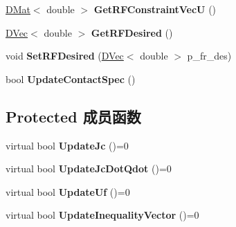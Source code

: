 \begin{DoxyCompactItemize}
\item 
\mbox{\label{classquadruped_1_1ContactSpec_ae668499ca7c34a8b950f58f45d4ad46f}} 
\hyperlink{cppTypes_8h_a5db6bfb25afa103db1fb6bb6287ae9d7}{D\+Mat}$<$ double $>$ {\bfseries Get\+R\+F\+Constraint\+VecU} ()
\item 
\mbox{\label{classquadruped_1_1ContactSpec_aec2ef05980f997148235386ae649510c}} 
\hyperlink{cppTypes_8h_adad69baca3c77d5f991be5d3c063fea7}{D\+Vec}$<$ double $>$ {\bfseries Get\+R\+F\+Desired} ()
\item 
\mbox{\label{classquadruped_1_1ContactSpec_a2f393f9d8a2fe2cadb9eb80a3d16aa44}} 
void {\bfseries Set\+R\+F\+Desired} (\hyperlink{cppTypes_8h_adad69baca3c77d5f991be5d3c063fea7}{D\+Vec}$<$ double $>$ p\+\_\+fr\+\_\+des)
\item 
\mbox{\label{classquadruped_1_1ContactSpec_a80906be5d63dd6b118e7ac5363989902}} 
bool {\bfseries Update\+Contact\+Spec} ()
\end{DoxyCompactItemize}
\subsection*{Protected 成员函数}
\begin{DoxyCompactItemize}
\item 
\mbox{\label{classquadruped_1_1ContactSpec_afb40142b1239dde30c41ed44df0cd187}} 
virtual bool {\bfseries Update\+Jc} ()=0
\item 
\mbox{\label{classquadruped_1_1ContactSpec_af7930d5409ea0c4e6de5ab7c8f3b1bed}} 
virtual bool {\bfseries Update\+Jc\+Dot\+Qdot} ()=0
\item 
\mbox{\label{classquadruped_1_1ContactSpec_a4ad0b239265a6c6b84baa072792bb448}} 
virtual bool {\bfseries Update\+Uf} ()=0
\item 
\mbox{\label{classquadruped_1_1ContactSpec_a6d822adbe56fcd0f91d76dec7665f739}} 
virtual bool {\bfseries Update\+Inequality\+Vector} ()=0
\end{DoxyCompactItemize}
